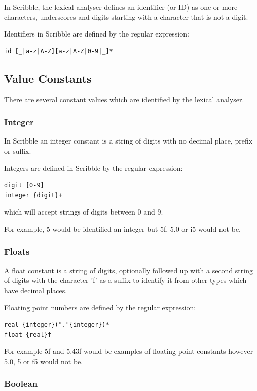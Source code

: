 \documentclass[]{final_report}
\begin{document}
In Scribble, the lexical analyser defines an identifier (or ID) as one or more characters, underscores and digits starting with a character that is not a digit. 

Identifiers in Scribble are defined by the regular expression:
\begin{verbatim}
id [_|a-z|A-Z][a-z|A-Z|0-9|_]*
\end{verbatim}

\subsection{Value Constants}

There are several constant values which are identified by the lexical analyser.

\subsubsection{Integer}

In Scribble an integer constant is a string of digits with no decimal place, prefix or suffix. 

Integers are defined in Scribble by the regular expression:
\begin{verbatim}
digit [0-9]
integer {digit}+
\end{verbatim}

which will accept strings of digits between 0 and 9.

For example, 5 would be identified an integer but 5f, 5.0 or i5 would not be.

\subsubsection{Floats}

A float constant is a string of digits, optionally followed up with a second string of digits with the character 'f' as a suffix to identify it from other types which have decimal places. 

Floating point numbers are defined by the regular expression:
\begin{verbatim}
real {integer}("."{integer})*
float {real}f
\end{verbatim}

For example 5f and 5.43f would be examples of floating point constants however 5.0, 5 or f5 would not be.

\subsubsection{Boolean}
\end{document}
